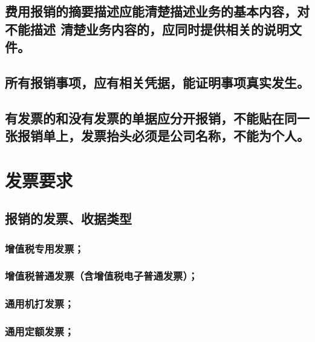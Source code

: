 \documentclass[scheme=plain,UTF8]{ctexart}
\begin{document}
\subsection{费用报销的摘要描述应能清楚描述业务的基本内容，对不能描述
清楚业务内容的，应同时提供相关的说明文件。}
\subsection{所有报销事项，应有相关凭据，能证明事项真实发生。}
\subsection{有发票的和没有发票的单据应分开报销，不能贴在同一张报销单上，发票抬头必须是公司名称，不能为个人。}

\section{发票要求}
\subsection{报销的发票、收据类型}
\subsubsection{增值税专用发票；}
\subsubsection{增值税普通发票（含增值税电子普通发票）；}
\subsubsection{通用机打发票；}
\subsubsection{通用定额发票；}
\end{document}
